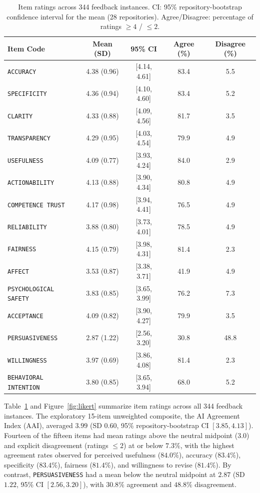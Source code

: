 \documentclass{llncs}
\begin{document}
\begin{table}[t]
\caption{Item ratings across 344 feedback instances. CI: 95\% repository-bootstrap confidence interval for the mean (28 repositories). Agree/Disagree: percentage of ratings $\ge 4$ / $\le 2$.}
\label{tab:rq1}
\centering\scriptsize
\renewcommand{\arraystretch}{0.86}
\setlength{\aboverulesep}{1pt}
\setlength{\belowrulesep}{1.2pt}
\setlength\tabcolsep{4pt}
\begin{tabular}{@{}lcccc@{}}
\toprule
Item Code & Mean (SD) & 95\% CI & Agree (\%) & Disagree (\%) \\
\midrule
\texttt{ACCURACY} & 4.38 (0.96) & [4.14, 4.61] & 83.4 & 5.5 \\
\texttt{SPECIFICITY} & 4.36 (0.94) & [4.10, 4.60] & 83.4 & 5.2 \\
\texttt{CLARITY} & 4.33 (0.88) & [4.09, 4.56] & 81.7 & 3.5 \\
\texttt{TRANSPARENCY} & 4.29 (0.95) & [4.03, 4.54] & 79.9 & 4.9 \\
\texttt{USEFULNESS} & 4.09 (0.77) & [3.93, 4.24] & 84.0 & 2.9 \\
\texttt{ACTIONABILITY} & 4.13 (0.88) & [3.90, 4.34] & 80.8 & 4.9 \\
\texttt{COMPETENCE TRUST} & 4.17 (0.98) & [3.94, 4.41] & 76.5 & 4.9 \\
\texttt{RELIABILITY} & 3.88 (0.80) & [3.73, 4.01] & 78.5 & 4.9 \\
\texttt{FAIRNESS} & 4.15 (0.79) & [3.98, 4.31] & 81.4 & 2.3 \\
\texttt{AFFECT} & 3.53 (0.87) & [3.38, 3.71] & 41.9 & 4.9 \\
\texttt{PSYCHOLOGICAL SAFETY} & 3.83 (0.85) & [3.65, 3.99] & 76.2 & 7.3 \\
\texttt{ACCEPTANCE} & 4.09 (0.82) & [3.90, 4.27] & 79.9 & 3.5 \\
\texttt{PERSUASIVENESS} & 2.87 (1.22) & [2.56, 3.20] & 30.8 & 48.8 \\
\texttt{WILLINGNESS} & 3.97 (0.69) & [3.86, 4.08] & 81.4 & 2.3 \\
\texttt{BEHAVIORAL INTENTION} & 3.80 (0.85) & [3.65, 3.94] & 68.0 & 5.2 \\
\bottomrule
\end{tabular}
\vspace{-2mm}
\end{table}

Table~\ref{tab:rq1} and Figure~\ref{fig:likert} summarize item ratings across all 344 feedback instances. The exploratory 15-item unweighted composite, the AI Agreement Index (AAI), averaged $3.99$ (SD $0.60$, 95\% repository-bootstrap CI $[3.85, 4.13]$). Fourteen of the fifteen items had mean ratings above the neutral midpoint ($3.0$) and explicit disagreement (ratings $\le 2$) at or below $7.3\%$, with the highest agreement rates observed for perceived usefulness ($84.0\%$), accuracy ($83.4\%$), specificity ($83.4\%$), fairness ($81.4\%$), and willingness to revise ($81.4\%$). By contrast, \texttt{PERSUASIVENESS} had a mean below the neutral midpoint at $2.87$ (SD $1.22$, 95\% CI $[2.56, 3.20]$), with $30.8\%$ agreement and $48.8\%$ disagreement.
\end{document}
